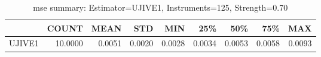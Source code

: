 \begin{table}[ht]
\centering
\caption{mse summary: Estimator=UJIVE1, Instruments=125, Strength=0.70}
\begin{tabular}{lrrrrrrrr}
\toprule
 & COUNT & MEAN & STD & MIN & 25\% & 50\% & 75\% & MAX \\
\midrule
UJIVE1 & 10.0000 & 0.0051 & 0.0020 & 0.0028 & 0.0034 & 0.0053 & 0.0058 & 0.0093 \\
\bottomrule
\end{tabular}
\end{table}
